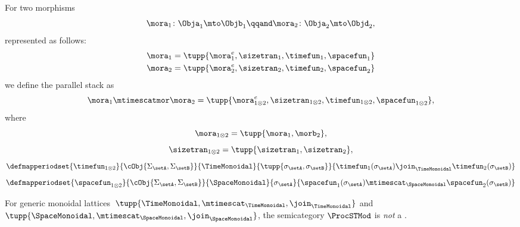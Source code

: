 \begin{lemma}
    For two morphisms
    \begin{equation}
        \mora_1 \colon \Obja_1 \mto \Objb_1
        \qqand
        \mora_2 \colon \Obja_2 \mto \Objd_2,
    \end{equation}
    represented as follows:
    \begin{align}
        \mora_1 & = \tupp{\mora^e_1, \sizetran_1,  \timefun_1,
        \spacefun_{1}  } \\
        \mora_2 & = \tupp{\mora^e_2, \sizetran_2,  \timefun_2, \spacefun_{2} }
    \end{align}
    we define the parallel stack as
    \begin{equation}
        \mora_1 \mtimescatmor \mora_2 = \tupp{
        \mora^e_{1\otimes2},
        \sizetran_{1\otimes2},
        \timefun_{1\otimes2},
        \spacefun_{1\otimes2}
        },
    \end{equation}
    where
    \begin{equation}
        \mora_{1\otimes2} = \tupp{\mora_1, \morb_2},
    \end{equation}
    \begin{equation}
        \sizetran_{1\otimes2} =  \tupp{\sizetran_1, \sizetran_2},
    \end{equation}
    \begin{equation}
        \defmapperiodset{
            \timefun_{1\otimes 2}
        }{
            \cObj {\Sigma_{\setA}, \Sigma_{\setB}}
        }{
            \TimeMonoidal
        }{
            \tupp{\sigma_{\setA}, \sigma_{\setB}}
        }{
            \timefun_1(\sigma_{\setA}) \join_{\TimeMonoidal} \timefun_2(\sigma_{\setB})
        }
    \end{equation}
    \begin{equation}
        \defmapperiodset{
            \spacefun_{1\otimes2}
        }{
            \cObj {\Sigma_{\setA}, \Sigma_{\setB}}
        }{
            \SpaceMonoidal
        }{
            \sigma_{\setA}
        }{
            \spacefun_1(\sigma_{\setA}) \mtimescat_{\SpaceMonoidal} \spacefun_2(\sigma_{\setB})
        }
    \end{equation}
\end{lemma}

\begin{lemma}
    For generic monoidal lattices~$\tupp{\TimeMonoidal, \mtimescat_{\TimeMonoidal}, \join_{\TimeMonoidal}}$ and $\tupp{\SpaceMonoidal, \mtimescat_{\SpaceMonoidal}, \join_{\SpaceMonoidal}}$, the semicategory $\ProcSTMod$  is \emph{not} a .
\end{lemma}

